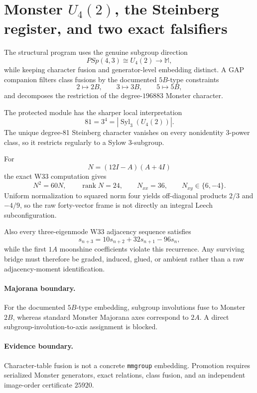 \providecommand{\rank}{\operatorname{rank}}
\section{Monster \(U_4(2)\), the Steinberg register, and two exact falsifiers}
\label{sec:monster-u42-steinberg-falsifiers}
The structural program uses the genuine subgroup direction
\[
PSp(4,3)\cong U_4(2)\longrightarrow\mathbb M,
\]
while keeping character fusion and generator-level embedding distinct. A GAP companion filters class fusions by the documented \(5B\)-type constraints
\[
2\mapsto2B,\qquad3\mapsto3B,\qquad5\mapsto5B,
\]
and decomposes the restriction of the degree-\(196883\) Monster character.

The protected module has the sharper local interpretation
\[
81=3^4=|\operatorname{Syl}_3(U_4(2))|.
\]
The unique degree-81 Steinberg character vanishes on every nonidentity 3-power class, so it restricts regularly to a Sylow 3-subgroup.

For
\[
N=(12I-A)(A+4I)
\]
the exact W33 computation gives
\[
N^2=60N,\qquad\rank N=24,\qquad N_{xx}=36,\qquad N_{xy}\in\{6,-4\}.
\]
Uniform normalization to squared norm four yields off-diagonal products \(2/3\) and \(-4/9\), so the raw forty-vector frame is not directly an integral Leech subconfiguration.

Also every three-eigenmode W33 adjacency sequence satisfies
\[
s_{n+3}=10s_{n+2}+32s_{n+1}-96s_n,
\]
while the first \(1A\) moonshine coefficients violate this recurrence. Any surviving bridge must therefore be graded, induced, glued, or ambient rather than a raw adjacency-moment identification.

\paragraph{Majorana boundary.} For the documented \(5B\)-type embedding, subgroup involutions fuse to Monster \(2B\), whereas standard Monster Majorana axes correspond to \(2A\). A direct subgroup-involution-to-axis assignment is blocked.

\paragraph{Evidence boundary.} Character-table fusion is not a concrete \texttt{mmgroup} embedding. Promotion requires serialized Monster generators, exact relations, class fusion, and an independent image-order certificate \(25920\).
